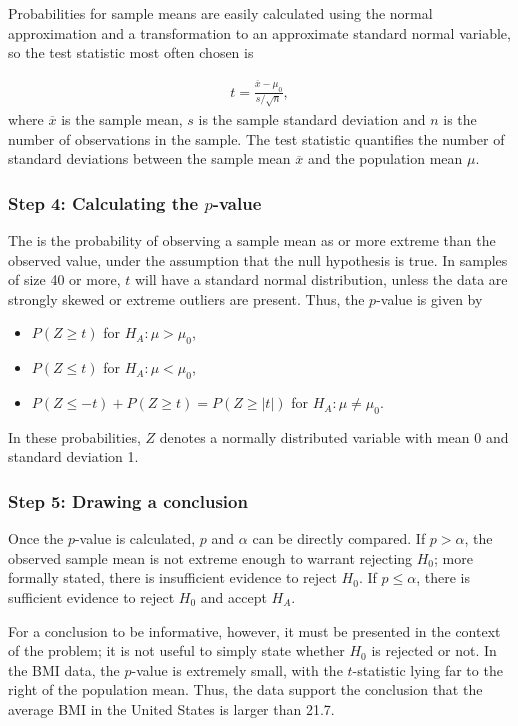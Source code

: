 \begin{spacing}{1.5}
Probabilities for sample means are easily calculated using the normal approximation and a transformation to an approximate standard normal variable, so the test statistic most often chosen is 

\begin{align}
t=\frac{\overline{x}-\mu_0}{s/\sqrt{n}},
\end{align}
where $\overline{x}$ is the sample mean, $s$ is the sample standard deviation and $n$ is the number of observations in the sample. The test statistic quantifies the number of standard deviations between the sample mean $\overline{x}$ and the population mean $\mu$.

\subsubsection{Step 4: Calculating the $p$-value}

The  is the probability of observing a sample mean as or more extreme than the observed value, under the assumption that the null hypothesis is true. In samples of size 40 or more, $t$ will have a standard normal distribution, unless the data are strongly skewed or extreme outliers are present. Thus, the $p$-value is given by

\begin{itemize}
	\item $P(Z \geq t)$ for $H_A: \mu > \mu_0$,
	
	\item $P(Z \leq t)$ for $H_A: \mu < \mu_0$,
	
	\item $P(Z \leq -t) + P(Z \geq t) = P(Z \geq |t| )$ for $H_A: \mu \neq \mu_0.$
\end{itemize}
In these probabilities, $Z$ denotes a normally distributed variable with mean 0 and standard deviation 1.

\subsubsection{Step 5: Drawing a conclusion}

Once the $p$-value is calculated, $p$ and $\alpha$ can be directly compared. If $p > \alpha$, the observed sample mean is not extreme enough to warrant rejecting $H_0$; more formally stated, there is insufficient evidence to reject $H_0$. If $p \leq \alpha$, there is sufficient evidence to reject $H_0$ and accept $H_A$. 

For a conclusion to be informative, however, it must be presented in the context of the problem; it is not useful to simply state whether $H_0$ is rejected or not. In the  BMI data, the $p$-value is extremely small, with the $t$-statistic lying far to the right of the population mean. Thus, the data support the conclusion that the average BMI in the United States is larger than 21.7. 


\end{spacing}
